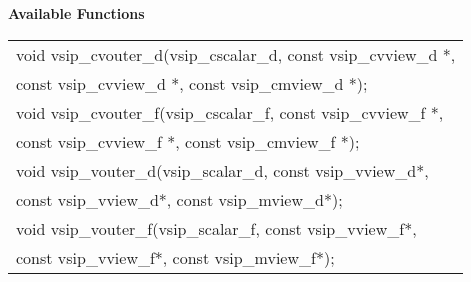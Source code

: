 \\\cvsiplh
\\ \hspace*{.8cm} \vspace*{.1cm} \textbf{Available Functions }
\\ \hspace*{0.03\textwidth} {
\ttfamily
\begin{tabular}[H]{l}
void vsip\_cvouter\_d(vsip\_cscalar\_d, const vsip\_cvview\_d *,\\*\hspace{.6cm}const vsip\_cvview\_d *, const vsip\_cmview\_d *);\\
void vsip\_cvouter\_f(vsip\_cscalar\_f, const vsip\_cvview\_f *,\\*\hspace{.6cm}const vsip\_cvview\_f *, const vsip\_cmview\_f *);\\
void vsip\_vouter\_d(vsip\_scalar\_d, const vsip\_vview\_d*,\\*\hspace{.6cm}const vsip\_vview\_d*, const vsip\_mview\_d*);\\
void vsip\_vouter\_f(vsip\_scalar\_f, const vsip\_vview\_f*,\\*\hspace{.6cm}const vsip\_vview\_f*, const vsip\_mview\_f*);\\
\end{tabular}
}
\\\pyjvsiph
